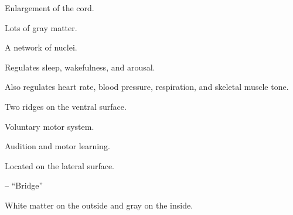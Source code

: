 \begin{coloredlist}
    \item {}
    \begin{coloredlist}
        \item {}
        \begin{coloredlist}
            \item Enlargement of the cord.
            \item Lots of gray matter.
            \item {}
            \begin{coloredlist}
                \item A network of nuclei.
                \item Regulates sleep, wakefulness, and arousal.
                \item Also regulates heart rate, blood pressure, respiration, and skeletal muscle tone.
            \end{coloredlist}
            \item {}
            \begin{coloredlist}
                \item Two ridges on the ventral surface.
                \begin{coloredlist}
                    \item Voluntary motor system.
                \end{coloredlist}
            \end{coloredlist}
            \item {}
            \begin{coloredlist}
                \item Audition and motor learning.
                \item Located on the lateral surface.
            \end{coloredlist}
        \end{coloredlist}
    \end{coloredlist}
    \item {}
    \begin{coloredlist}
        \item {} -- ``Bridge''
        \begin{coloredlist}
            \item White matter on the outside and gray on the inside.
            \item {}

\end{coloredlist}
\end{coloredlist}
\end{coloredlist}
